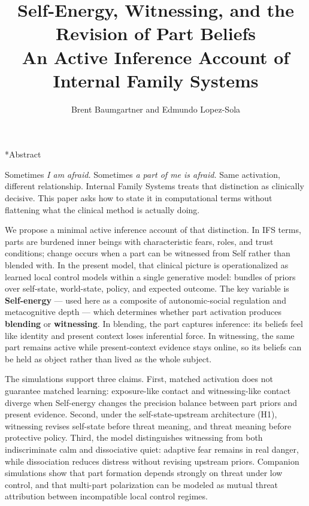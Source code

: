 \documentclass[11pt,a4paper]{article}
\title{\textbf{Self-Energy, Witnessing, and the Revision of Part
Beliefs}\\[0.4em]\large An Active Inference Account of Internal Family
Systems}
\author{Brent Baumgartner and Edmundo Lopez-Sola}
\date{}
\makeatletter
\renewcommand{\maketitle}{
  \thispagestyle{empty}
  \begin{center}
    {\LARGE\bfseries \@title\par}
    \vspace{0.55em}
    {\large \@author\par}
    \vspace{1.4em}
  \end{center}
}
\renewcommand\section{\@startsection{section}{1}{0pt}{2.3ex plus 0.6ex minus 0.2ex}{1.1ex plus 0.2ex}{\large\bfseries}}
\makeatother
\begin{document}
\maketitle

\section*{Abstract}

Sometimes \emph{I am afraid.} Sometimes \emph{a part of me is afraid.}
Same activation, different relationship. Internal Family Systems treats
that distinction as clinically decisive. This paper asks how to state it
in computational terms without flattening what the clinical method is
actually doing.

We propose a minimal active inference account of that distinction. In
IFS terms, parts are burdened inner beings with characteristic fears,
roles, and trust conditions; change occurs when a part can be witnessed
from Self rather than blended with. In the present model, that clinical
picture is operationalized as learned local control models within a
single generative model: bundles of priors over self-state, world-state,
policy, and expected outcome. The key variable is \textbf{Self-energy}
--- used here as a composite of autonomic-social regulation and
metacognitive depth --- which determines whether part activation
produces \textbf{blending} or \textbf{witnessing}. In blending, the part
captures inference: its beliefs feel like identity and present context
loses inferential force. In witnessing, the same part remains active
while present-context evidence stays online, so its beliefs can be held
as object rather than lived as the whole subject.

The simulations support three claims. First, matched activation does not
guarantee matched learning: exposure-like contact and witnessing-like
contact diverge when Self-energy changes the precision balance between
part priors and present evidence. Second, under the self-state-upstream
architecture (H1), witnessing revises self-state before threat meaning,
and threat meaning before protective policy. Third, the model
distinguishes witnessing from both indiscriminate calm and dissociative
quiet: adaptive fear remains in real danger, while dissociation reduces
distress without revising upstream priors. Companion simulations show
that part formation depends strongly on threat under low control, and
that multi-part polarization can be modeled as mutual threat attribution
between incompatible local control regimes.
\end{document}

